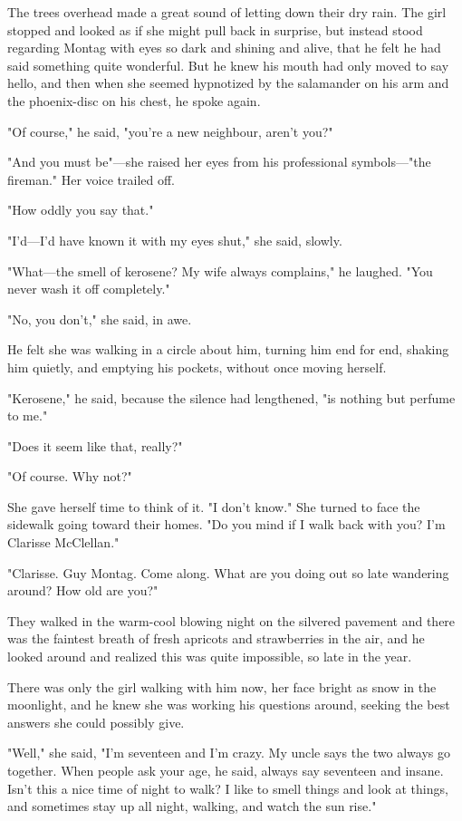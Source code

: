\documentclass[10pt,a4paper]{article}
\begin{document}
The trees overhead made a great sound of letting 
down their dry rain. The girl stopped and looked as if she 
might pull back in surprise, but instead stood regarding 
Montag with eyes so dark and shining and alive, that he felt 
he had said something quite wonderful. But he knew his 
mouth had only moved to say hello, and then when she 
seemed hypnotized by the salamander on his arm and the 
phoenix-disc on his chest, he spoke again. 

"Of course," he said, "you're a new neighbour, aren't you?" 

"And you must be"—she raised her eyes from his 
professional symbols—"the fireman." Her voice trailed off. 

"How oddly you say that." 

"I'd—I'd have known it with my eyes shut," she said, slowly. 

"What—the smell of kerosene? My wife always 
complains," he laughed. "You never wash it off completely." 

"No, you don't," she said, in awe. 

He felt she was walking in a circle about him, turning 
him end for end, shaking him quietly, and emptying his 
pockets, without once moving herself. 

"Kerosene," he said, because the silence had 
lengthened, "is nothing but perfume to me." 

"Does it seem like that, really?" 

"Of course. Why not?" 

She gave herself time to think of it. "I don't know." 
She turned to face the sidewalk going toward their homes. 
"Do you mind if I walk back with you? I'm Clarisse 
McClellan." 

"Clarisse. Guy Montag. Come along. What are you 
doing out so late wandering around? How old are you?" 

They walked in the warm-cool blowing night on the 
silvered pavement and there was the faintest breath of fresh 
apricots and strawberries in the air, and he looked around 
and realized this was quite impossible, so late in the year. 

There was only the girl walking with him now, her 
face bright as snow in the moonlight, and he knew she was 
working his questions around, seeking the best answers she 
could possibly give. 

"Well," she said, "I'm seventeen and I'm crazy. My 
uncle says the two always go together. When people ask 
your age, he said, always say seventeen and insane. Isn't 
this a nice time of night to walk? I like to smell things and 
look at things, and sometimes stay up all night, walking, and 
watch the sun rise." 
\end{document}
